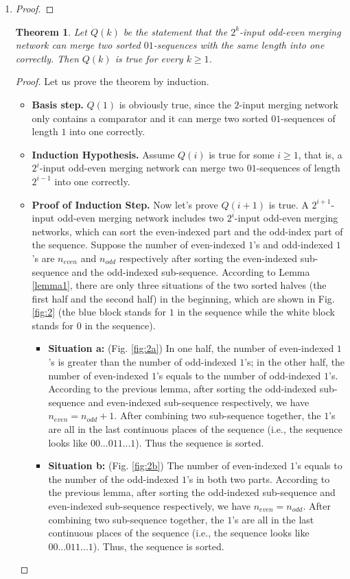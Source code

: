 \documentclass[12pt,a4paper]{article}
\makeatletter
\newtheorem{theorem}{Theorem}
\newtheorem*{solution}{Solution}
\theoremstyle{definition}
\renewenvironment{solution}[1][Solution] {\par\pushQED{\qed}\normalfont\topsep6\p@\@plus6\p@\relax\trivlist\item[\hskip\labelsep\bfseries#1\@addpunct{.}]\ignorespaces}{\popQED\endtrivlist\@endpefalse} \makeatother
\makeatother
\begin{document}
\begin{enumerate}
\begin{solution}
\begin{enumerate}
\begin{proof}
        \end{proof}
        \begin{theorem}
            \label{theorem2}
            Let $Q(k)$ be the statement that the $2^k$-input odd-even merging network can merge two sorted $01$-sequences with the same length into one correctly. Then $Q(k)$ is true for every $k \geq 1$.
        \end{theorem}
        \begin{proof} Let us prove the theorem by induction.
            \begin{itemize}
            \item {\color{blue} \textbf{Basis step.}} $Q(1)$ is obviously true, since the $2$-input merging network only contains a comparator and it can merge two sorted $01$-sequences of length $1$ into one correctly.
            \item {\color{blue} \textbf{Induction Hypothesis.}} Assume $Q(i)$ is true for some $i \geq 1$, that is, a $2^i$-input odd-even merging network can merge two $01$-sequences of length $2^{i-1}$ into one correctly.
            \item {\color{blue} \textbf{Proof of Induction Step.}} Now let's prove $Q(i+1)$ is true. A $2^{i+1}$-input odd-even merging network includes two $2^i$-input odd-even merging networks, which can sort the even-indexed part and the odd-index part of the sequence. Suppose the number of even-indexed $1$'s and odd-indexed $1$'s are $n_{even}$ and $n_{odd}$ respectively after sorting the even-indexed sub-sequence and the odd-indexed sub-sequence. According to Lemma \ref{lemma1}, there are only three situations of the two sorted halves (the first half and the second half) in the beginning, which are shown in Fig. \ref{fig:2} (the blue block stands for $1$ in the sequence while the white block stands for $0$ in the sequence).
            \begin{itemize}
            \item \textbf{Situation a:} (Fig. \ref{fig:2a}) In one half, the number of even-indexed $1$'s is greater than the number of odd-indexed $1$'s; in the other half, the number of even-indexed $1$'s equals to the number of odd-indexed $1$'s. According to the previous lemma, after sorting the odd-indexed sub-sequence and even-indexed sub-sequence respectively, we have $n_{even} = n_{odd} + 1$. After combining two sub-sequence together, the $1$'s are all in the last continuous places of the sequence (i.e., the sequence looks like $00...011...1$). Thus the sequence is sorted.
            \item \textbf{Situation b:} (Fig. \ref{fig:2b}) The number of even-indexed $1$'s equals to the number of the odd-indexed $1$'s in both two parts. According to the previous lemma, after sorting the odd-indexed sub-sequence and even-indexed sub-sequence respectively, we have $n_{even} = n_{odd}$. After combining two sub-sequence together, the $1$'s are all in the last continuous places of the sequence (i.e., the sequence looks like $00...011...1$). Thus, the sequence is sorted.

\end{itemize}
\end{itemize}
\end{proof}
\end{enumerate}
\end{solution}
\end{enumerate}
\end{document}
